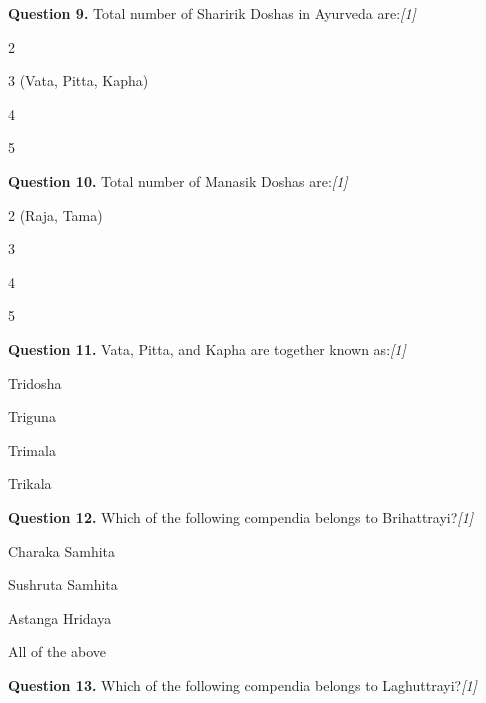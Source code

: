 \documentclass[11pt,a4paper]{article}
\newcommand{\pts}[1]{\hfill   \textit{[#1]}}
\begin{document}
\medskip




\noindent   \textbf{Question 9.} Total number of Sharirik Doshas in Ayurveda are:\pts{1}

\begin{parts}
  \item 2
  \item 3 (Vata, Pitta, Kapha)
  \item 4
  \item 5
\end{parts}

\medskip




\noindent   \textbf{Question 10.} Total number of Manasik Doshas are:\pts{1}

\begin{parts}
  \item 2 (Raja, Tama)
  \item 3
  \item 4
  \item 5
\end{parts}

\medskip




\noindent   \textbf{Question 11.} Vata, Pitta, and Kapha are together known as:\pts{1}

\begin{parts}
  \item Tridosha
  \item Triguna
  \item Trimala
  \item Trikala
\end{parts}

\medskip




\noindent   \textbf{Question 12.} Which of the following compendia belongs to Brihattrayi?\pts{1}

\begin{parts}
  \item Charaka Samhita
  \item Sushruta Samhita
  \item Astanga Hridaya
  \item All of the above
\end{parts}

\medskip




\noindent   \textbf{Question 13.} Which of the following compendia belongs to Laghuttrayi?\pts{1}
\end{document}
